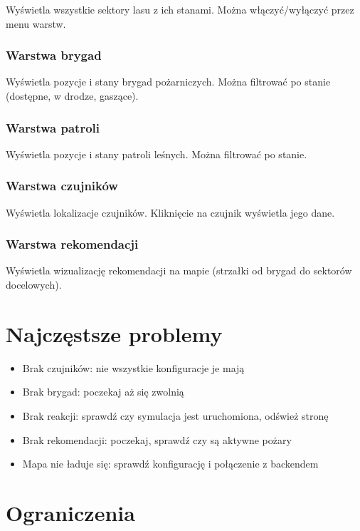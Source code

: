 \documentclass[11pt,a4paper]{article}
\begin{document}
Wyświetla wszystkie sektory lasu z ich stanami. Można włączyć/wyłączyć przez menu warstw.

\subsubsection{Warstwa brygad}

Wyświetla pozycje i stany brygad pożarniczych. Można filtrować po stanie (dostępne, w drodze, gaszące).

\subsubsection{Warstwa patroli}

Wyświetla pozycje i stany patroli leśnych. Można filtrować po stanie.

\subsubsection{Warstwa czujników}

Wyświetla lokalizacje czujników. Kliknięcie na czujnik wyświetla jego dane.

\subsubsection{Warstwa rekomendacji}

Wyświetla wizualizację rekomendacji na mapie (strzałki od brygad do sektorów docelowych).

\section{Najczęstsze problemy}

\begin{itemize}
    \item Brak czujników: nie wszystkie konfiguracje je mają
    \item Brak brygad: poczekaj aż się zwolnią
    \item Brak reakcji: sprawdź czy symulacja jest uruchomiona, odśwież stronę
    \item Brak rekomendacji: poczekaj, sprawdź czy są aktywne pożary
    \item Mapa nie ładuje się: sprawdź konfigurację i połączenie z backendem
\end{itemize}

\section{Ograniczenia}
\end{document}
